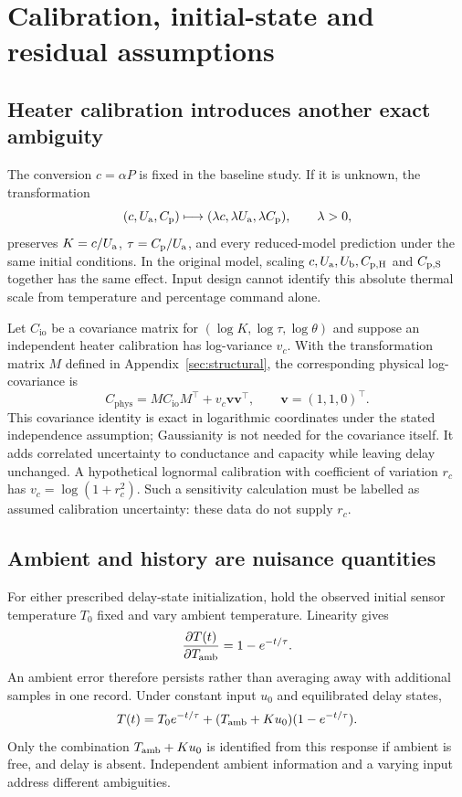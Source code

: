 \section{Calibration, initial-state and residual assumptions}
\label{sec:nuisance-assumptions}

\subsection{Heater calibration introduces another exact ambiguity}
The conversion $c=\alpha P$ is fixed in the baseline study. If it is unknown,
the transformation
\[
 (c,U_{\mathrm a},C_{\mathrm p})\longmapsto(\lambda c,\lambda U_{\mathrm a},\lambda C_{\mathrm p}),
 \qquad \lambda>0,
\]
preserves $K=c/U_{\mathrm a}$, $\tau=C_{\mathrm p}/U_{\mathrm a}$, and every reduced-model prediction under
the same initial conditions. In the original model, scaling $c,U_{\mathrm a},U_{\mathrm b},C_{\mathrm{p,H}}$
and $C_{\mathrm{p,S}}$ together has the same effect. Input design cannot identify this
absolute thermal scale from temperature and percentage command alone.

Let $C_{\mathrm{io}}$ be a covariance matrix for
$(\log K,\log\tau,\log\theta)$ and suppose an independent heater calibration
has log-variance $v_c$. With the transformation matrix $M$ defined in
Appendix~\ref{sec:structural}, the corresponding physical log-covariance is
\[
 C_{\mathrm{phys}}=M C_{\mathrm{io}}M^\top+v_c\bm v\bm v^\top,
 \qquad \bm v=(1,1,0)^\top.
\]
This covariance identity is exact in logarithmic coordinates under the stated
independence assumption; Gaussianity is not needed for the covariance itself.
It adds correlated uncertainty to conductance and capacity while leaving delay
unchanged. A hypothetical lognormal calibration with coefficient of variation
$r_c$ has $v_c=\log(1+r_c^2)$. Such a sensitivity calculation must be labelled
as assumed calibration uncertainty: these data do not supply $r_c$.

\subsection{Ambient and history are nuisance quantities}
For either prescribed delay-state initialization, hold the observed initial
sensor temperature $T_0$ fixed and vary ambient temperature. Linearity gives
\[
 \frac{\partial T(t)}{\partial T_{\mathrm{amb}}}=1-e^{-t/\tau}.
\]
An ambient error therefore persists rather than averaging away with additional
samples in one record. Under constant input $u_0$ and equilibrated delay states,
\[
 T(t)=T_0 e^{-t/\tau}+(T_{\mathrm{amb}}+Ku_0)(1-e^{-t/\tau}).
\]
Only the combination $T_{\mathrm{amb}}+Ku_0$ is identified from this response if ambient
is free, and delay is absent. Independent ambient information and a varying
input address different ambiguities.

